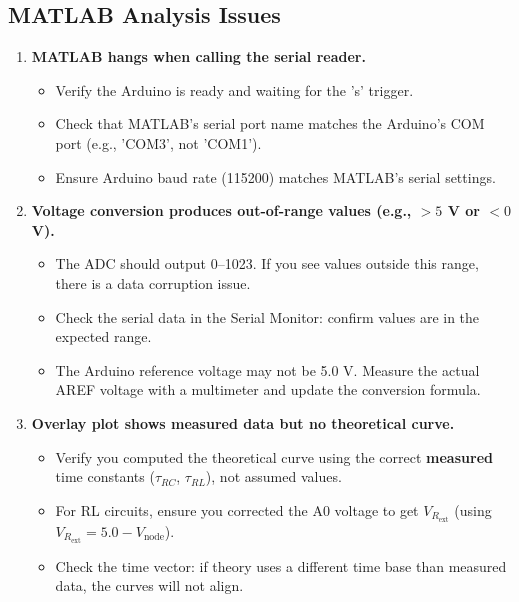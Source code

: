 \documentclass[11pt,letterpaper]{article}
\begin{document}
\subsection*{MATLAB Analysis Issues}

\begin{enumerate}
    \item \textbf{MATLAB hangs when calling the serial reader.}
    \begin{itemize}
        \item Verify the Arduino is ready and waiting for the 's' trigger.
        \item Check that MATLAB's serial port name matches the Arduino's COM port (e.g., 'COM3', not 'COM1').
        \item Ensure Arduino baud rate (115200) matches MATLAB's serial settings.
    \end{itemize}

    \item \textbf{Voltage conversion produces out-of-range values (e.g., $>5$ V or $<0$ V).}
    \begin{itemize}
        \item The ADC should output 0--1023. If you see values outside this range, there is a data corruption issue.
        \item Check the serial data in the Serial Monitor: confirm values are in the expected range.
        \item The Arduino reference voltage may not be 5.0 V. Measure the actual AREF voltage with a multimeter and update the conversion formula.
    \end{itemize}

    \item \textbf{Overlay plot shows measured data but no theoretical curve.}
    \begin{itemize}
        \item Verify you computed the theoretical curve using the correct \textbf{measured} time constants ($\tau_{RC}$, $\tau_{RL}$), not assumed values.
        \item For RL circuits, ensure you corrected the A0 voltage to get $V_{R_{\text{ext}}}$ (using $V_{R_{\text{ext}}} = 5.0 - V_{\text{node}}$).
        \item Check the time vector: if theory uses a different time base than measured data, the curves will not align.
    \end{itemize}


\end{enumerate}
\end{document}

